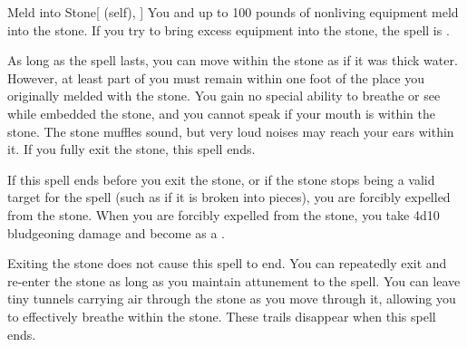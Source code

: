 \lowercase{\hypertarget{spell:Meld into Stone}{}}\label{spell:Meld into Stone}
\begin{attuneability}[Rank 3]{\hypertarget{spell:Meld into Stone}{Meld into Stone}}[ (self), ]
You and up to 100 pounds of nonliving equipment meld into the stone.
If you try to bring excess equipment into the stone, the spell is .

As long as the spell lasts, you can move within the stone as if it was thick water.
However, at least part of you must remain within one foot of the place you originally melded with the stone.
You gain no special ability to breathe or see while embedded the stone, and you cannot speak if your mouth is within the stone.
The stone muffles sound, but very loud noises may reach your ears within it.
If you fully exit the stone, this spell ends.

If this spell ends before you exit the stone, or if the stone stops being a valid target for the spell (such as if it is broken into pieces), you are forcibly expelled from the stone.
When you are forcibly expelled from the stone, you take 4d10 bludgeoning damage and become  as a .

\rankline
{} Exiting the stone does not cause this spell to end.
You can repeatedly exit and re-enter the stone as long as you maintain attunement to the spell.
 You can leave tiny tunnels carrying air through the stone as you move through it, allowing you to effectively breathe within the stone.
These trails disappear when this spell ends.
\end{attuneability}
\vspace{0.25em}



